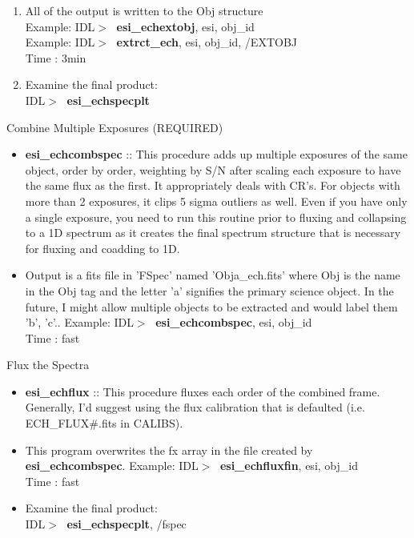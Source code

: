 \documentclass[11pt,letterpaper,dvips]{article}
\begin{document}
\begin{enumerate}
\begin{enumerate}
	\item  All of the output is written to the Obj structure \\
         \quad Example: IDL$> \;$ {\bf esi\_echextobj}, esi, obj\_id \\
         \quad Example: IDL$> \;$ {\bf extrct\_ech}, esi, obj\_id, /EXTOBJ \\
         \quad Time   : 3min 
	\item Examine the final product: \\
         \quad IDL$> \;$ {\bf esi\_echspecplt}
  \end{enumerate}

{\Large  \item Combine Multiple Exposures (REQUIRED)}
  \begin{itemize}
	\item {\bf esi\_echcombspec} ::
	This procedure adds up multiple exposures of the same object, order
	by order, weighting by S/N after scaling each exposure to have the
	same flux as the first.  It appropriately deals with CR's.  For objects
	with more than 2 exposures, it clips 5 sigma outliers as well.  Even
	if you have only a single exposure, you need to run this routine prior
	to fluxing and collapsing to a 1D spectrum as it creates the final
	spectrum structure that is necessary for fluxing and coadding to 1D.
	\item Output is a fits file in 'FSpec' named 'Obja\_ech.fits' where
	Obj is the name in the Obj tag and 
	the letter 'a' signifies the primary science object.  In the future,
	I might allow multiple objects to be extracted and would label 
	them 'b', 'c'..
         \quad Example: IDL$> \;$ {\bf esi\_echcombspec}, esi, obj\_id \\
         \quad Time   : fast \\
  \end{itemize}

{\Large  \item Flux the Spectra}
  \begin{itemize}
	\item {\bf esi\_echflux} ::
	This procedure fluxes each order of the combined frame.  Generally,
	I'd suggest using the flux calibration that is defaulted 
	(i.e. ECH\_FLUX\#.fits in CALIBS).
	\item This program overwrites the fx array in the file created by
	{\bf esi\_echcombspec}.
         \quad Example: IDL$> \;$ {\bf esi\_echfluxfin}, esi, obj\_id \\
         \quad Time   : fast \\
	\item Examine the final product: \\
         \quad IDL$> \;$ {\bf esi\_echspecplt}, /fspec
  \end{itemize}



\end{enumerate}
\end{document}
